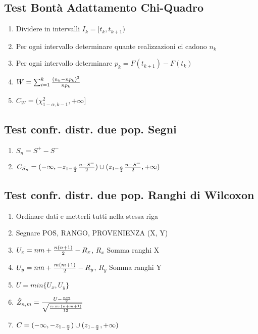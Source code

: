 \documentclass[12pt]{article}
\begin{document}
    \subsection{Test Bontà Adattamento Chi-Quadro}
    \begin{enumerate}
        \item Dividere in intervalli $I_k = [t_k, t_{k+1})$
        \item Per ogni intervallo determinare quante realizzazioni ci cadono $n_k$
        \item Per ogni intervallo determinare $p_k = F(t_{k+1}) - F(t_k)$
        \item $W = \sum_{i=1}^k {{(n_k - np_k)^2}\over{np_k}}$
        \item $C_{W} = (\chi^2_{1-\alpha, k-1}, +\infty]$
    \end{enumerate}
    \subsection{Test confr. distr. due pop. Segni}
    \begin{enumerate}
        \item $S_n = S^{+} - S^{-}$
        \item $C_{S_n} = (-\infty, -z_{1-{\alpha \over 2}} {{n-S^{=}}\over 2}) \cup (z_{1-{\alpha \over 2}}{{n-S^{=}}\over 2}, +\infty)$
    \end{enumerate}
    \newpage
    \subsection{Test confr. distr. due pop. Ranghi di Wilcoxon}
    \begin{enumerate}
        \item Ordinare dati e metterli tutti nella stessa riga
        \item Segnare POS, RANGO, PROVENIENZA (X, Y)
        \item $U_x = nm + {{n(n+1)}\over 2} - R_x$, $R_x$ Somma ranghi X
        \item $U_y = nm + {{m(m+1)}\over 2} - R_y$, $R_y$ Somma ranghi Y
        \item $U = min\{U_x, U_y\}$
        \item $\hat{Z}_{n, m} = {{U - {nm \over 2}}\over \sqrt{{n \cdot m \cdot (n+m+1)} \over 12 }}$
        \item $C = (-\infty, -z_{1-{\alpha \over 2}}) \cup (z_{1-{\alpha \over 2}}, +\infty)$
    \end{enumerate}
\end{document}
